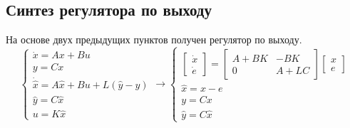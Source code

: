 \subsection{Синтез регулятора по выходу}
На основе двух предыдущих пунктов получен регулятор по выходу.
\[
        \begin{cases}
                \dot{x} = A x + B u\\
                y = C x \\
                \dot{\hat{x}} = A \hat{x} + B u + L(\hat{y} - y) \\
                \hat{y} = C \hat{x} \\
                u = K \hat{x}
        \end{cases} \rightarrow
        \begin{cases}
            \begin{bmatrix} 
                \dot{x} \\
                \dot{e}
            \end{bmatrix} = 
            \begin{bmatrix} 
                A + BK & -BK\\
                0 & A + LC
            \end{bmatrix}
            \begin{bmatrix} 
              x \\
              e
          \end{bmatrix} 
            \\
            \hat{x} = x - e \\
            y = Cx \\
            \hat{y} = C \hat{x}
         \end{cases}
\]

\FloatBarrier
